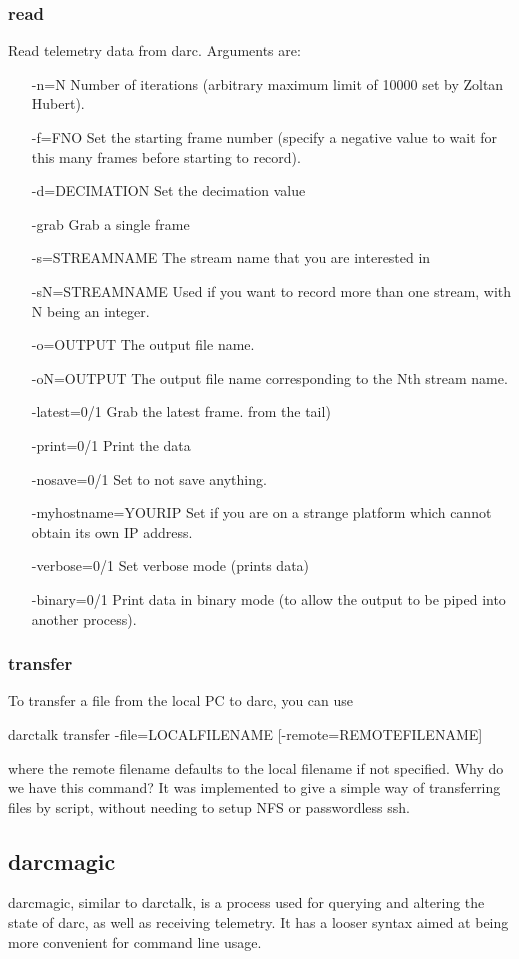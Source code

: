 \documentclass[a4,10pt]{article}
\begin{document}
\subsubsection{read}
Read telemetry data from darc.  Arguments are:
\begin{itemize}
\item[-n=N] Number of iterations (arbitrary maximum limit of 10000 set
  by Zoltan Hubert).
\item[-f=FNO] Set the starting frame number (specify a negative value
  to wait for this many frames before starting to record).
\item[-d=DECIMATION] Set the decimation value
\item[-grab] Grab a single frame
\item[-s=STREAMNAME] The stream name that you are interested in
\item[-sN=STREAMNAME] Used if you want to record more than one stream,
  with N being an integer.
\item[-o=OUTPUT] The output file name.
\item[-oN=OUTPUT] The output file name corresponding to the Nth stream
  name.
\item[-latest=0/1] Grab the latest frame.
  from the tail)
\item[-print=0/1] Print the data
\item[-nosave=0/1] Set to not save anything.
\item[-myhostname=YOURIP] Set if you are on a strange platform which
  cannot obtain its own IP address.
\item[-verbose=0/1] Set verbose mode (prints data)
\item[-binary=0/1] Print data in binary mode (to allow the output to
  be piped into another process).
\end{itemize}

\subsubsection{transfer}
To transfer a file from the local PC to darc, you can use

darctalk transfer -file=LOCALFILENAME [-remote=REMOTEFILENAME]

where the remote filename defaults to the local filename if not
specified.  Why do we have this command?  It was implemented to give a
simple way of transferring files by script, without needing to setup
NFS or passwordless ssh.

\subsection{darcmagic}
darcmagic, similar to darctalk, is a process used for querying and altering the state of
darc, as well as receiving telemetry.  It has a looser syntax aimed at
being more convenient for command line usage.
\end{document}
